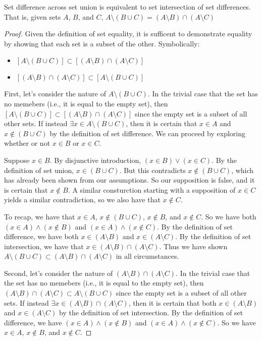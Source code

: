 \documentclass[main.tex]{subfiles}
\begin{document}
\bigbreak{}

\begin{thm}
	Set difference across set union is equivalent to set intersection of set
	differences. That is, given sets \(A\), \(B\), and \(C\),
	\(A \setminus (B \cup C) = (A \setminus B) \cap (A \setminus C)\)
\end{thm}
\begin{proof}
	Given the definition of set equality, it is sufficent to demonstrate
	equality by showing that each set is a subset of the other. Symbolically:
	\begin{itemize}
		\item \([A \setminus (B \cup C)] \subset [(A \setminus B) \cap (A \setminus C)]\)
		\item \([(A \setminus B) \cap (A \setminus C)] \subset [A \setminus (B \cup C)]\)
	\end{itemize}

	\medskip
	First, let's consider the nature of \(A \setminus (B \cup C)\). In the
	trivial case that the set has no memebers (i.e., it is equal to the
	empty set), then
	\([A \setminus (B \cup C)] \subset [(A \setminus B) \cap (A \setminus C)]\)
	since the empty set is a subset of all other sets. If instead
	\(\exists x \in A \setminus (B \cup C)\), then it is certain that
	\(x \in A\) and \(x \notin (B \cup C)\) by the definition of set
	difference. We can proceed by exploring whether or not \(x \in B\) or
	\(x \in C\).

	Suppose \(x \in B\). By disjunctive introduction,
	\((x \in B) \lor (x \in C)\). By the definition of set union,
	\(x \in (B \cup C)\). But this contradicts \(x \notin (B \cup C)\),
	which has already been shown from our assumptions. So our supposition
	is false, and it is certain that \(x \notin B\). A similar consturction
	starting with a supposition of \(x \in C\) yields a similar
	contradiction, so we also have that \(x \notin C\).

	To recap, we have that \(x \in A\), \(x \notin (B \cup C)\),
	\(x \notin B\), and \(x \notin C\). So we have both
	\((x \in A) \land (x \notin B)\) and \((x \in A) \land (x \notin C)\).
	By the definition of set difference, we have both
	\(x \in (A \setminus B)\) and \(x \in (A \setminus C)\). By the
	definition of set intersection, we have that
	\(x \in (A \setminus B) \cap (A \setminus C)\). Thus we have shown
	\(A \setminus (B \cup C) \subset (A \setminus B) \cap (A \setminus C)\)
	in all circumstances.

	\medskip
	Second, let's consider the nature of
	\((A \setminus B) \cap (A \setminus C)\). In the trivial case that the
	set has no memebers (i.e., it is equal to the empty set), then
	\((A \setminus B) \cap (A \setminus C) \subset A \setminus (B \cup C)\)
	since the empty set is a subset of all other sets. If instead
	\(\exists x \in (A \setminus B) \cap (A \setminus C)\), then it is
	certain that both \(x \in (A \setminus B)\) and
	\(x \in (A \setminus C)\) by the definition of set intersection. By the
	definition of set difference, we have \((x \in A) \land (x \notin B)\)
	and \((x \in A) \land (x \notin C)\). So we have \(x \in A\),
	\(x \notin B\), and \(x \notin C\).


\end{proof}
\end{document}
